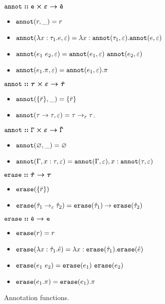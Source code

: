 \begin{figure}[h]
\vspace{-5pt}

	
$\bm{\mathtt{annot :: e \times \varepsilon \rightarrow \hat e}}$

\begin{itemize}
	\setlength\itemsep{-0.7em}
	\item[] $\mathtt{annot}(r, \_) = r$
	\item[] $\mathtt{annot}(\lambda x: \tau_1 . e, \varepsilon) = \lambda x: \mathtt{annot}(\tau_1, \varepsilon) . \mathtt{annot}(e, \varepsilon)$
	\item[] $\mathtt{annot}(e_1~e_2, \varepsilon) = \mathtt{annot}(e_1, \varepsilon)~\mathtt{annot}(e_2, \varepsilon)$
	\item[] $\mathtt{annot}(e_1.\pi, \varepsilon) = \mathtt{annot}(e_1, \varepsilon).\pi$
\end{itemize}
	
$\bm{\mathtt{annot :: \tau \times \varepsilon \rightarrow \hat \tau}}$

\begin{itemize}
	\setlength\itemsep{-0.7em}
	\item[] $\mathtt{annot}(\{ \bar r \}, \_) = \{ \bar r \}$
	\item[] $\mathtt{annot}(\tau \rightarrow \tau, \varepsilon) = \tau \rightarrow_{\varepsilon} \tau$.	
\end{itemize}

$\bm{\mathtt{annot :: \Gamma \times \varepsilon \rightarrow \hat \Gamma}}$

\begin{itemize}
	\setlength\itemsep{-0.7em}
	\item[] $\mathtt{annot}(\varnothing, \_) = \varnothing$
	\item[] $\mathtt{annot}(\Gamma, x: \tau, \varepsilon) = \mathtt{annot}(\Gamma, \varepsilon), x: \mathtt{annot}(\tau, \varepsilon)$
\end{itemize}

$\bm{\mathtt{erase :: \hat \tau \rightarrow \tau}}$
\begin{itemize}
	\setlength\itemsep{-0.7em}
	\item[] $\mathtt{erase}(\{ \bar r \})$
	\item[] $\mathtt{erase}(\hat \tau_1 \rightarrow_{\varepsilon} \hat \tau_2) = \mathtt{erase}(\hat \tau_1) \rightarrow \mathtt{erase}(\hat \tau_2)$
\end{itemize}

$\bm{\mathtt{erase :: \hat e \rightarrow e}}$
\begin{itemize}
	\setlength\itemsep{-0.7em}
	\item[] $\mathtt{erase}(r) = r$
	\item[] $\mathtt{erase}(\lambda x: \hat \tau_1 . \hat e) = \lambda x: \mathtt{erase}(\hat \tau_1) . \mathtt{erase}(\hat e)$
	\item[] $\mathtt{erase}(e_1~e_2) = \mathtt{erase}(e_1)~\mathtt{erase}(e_2)$
	\item[] $\mathtt{erase}(e_1.\pi) = \mathtt{erase}(e_1).\pi$
\end{itemize}

\vspace{-7pt}
\caption{Annotation functions.}
\label{This is the label.}
\end{figure}


